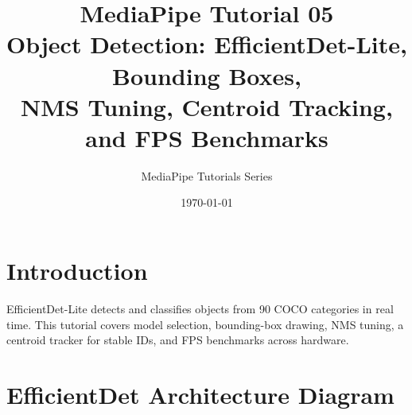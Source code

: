 \documentclass[12pt,a4paper]{article}
\begin{document}
\title{\textbf{\textcolor{mpblue}{MediaPipe Tutorial 05}}\\[0.4em]
    \large Object Detection: EfficientDet-Lite, Bounding Boxes,\\
    NMS Tuning, Centroid Tracking, and FPS Benchmarks}
\author{MediaPipe Tutorials Series}
\date{\today}
\maketitle
\tableofcontents
\newpage

\section{Introduction}

EfficientDet-Lite detects and classifies objects from 90 COCO categories in real time.
This tutorial covers model selection, bounding-box drawing, NMS tuning, a centroid tracker
for stable IDs, and FPS benchmarks across hardware.

\section{EfficientDet Architecture Diagram}

\bigskip
\end{document}
